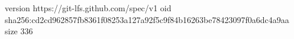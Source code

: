 version https://git-lfs.github.com/spec/v1
oid sha256:cd2cd962857fb8361f08253a127a92f5c9f84b16263be78423097f0a6dc4a9aa
size 336
